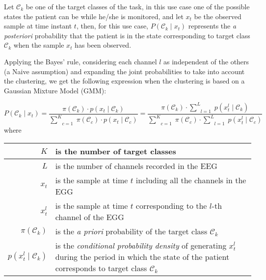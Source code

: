 \documentclass[a4paper,12pt]{article}
\begin{document}
\pagestyle{empty}

Let $\mathcal{C}_{k}$ be one of the target classes of the task, in this use case
one of the possible states the patient can be while he/she is monitored,
and let $x_{t}$ be the observed sample at time instant $t$,
then, for this use case, $P(\mathcal{C}_{k} \mid x_{t})$ represents the
\emph{a posteriori} probability that the patient is in the state corresponding
to target class $\mathcal{C}_{k}$ when the sample $x_{t}$ has been observed.

\bigskip

Applying the Bayes' rule, considering each channel $l$ as independent of the others (a Naive assumption)
and expanding the joint probabilities to take into account the clustering, we get the following 
expression when the clustering is based on a Gaussian Mixture Model (GMM):



\[
P(\mathcal{C}_{k} \mid x_{t})
    = \frac{\pi(\mathcal{C}_{k}) \cdot p(x_{t} \mid \mathcal{C}_{k})}{\underset{c=1}{\overset{K}{\sum}} \;  \pi(\mathcal{C}_{c}) \cdot p(x_{t} \mid \mathcal{C}_{c})}
    = \frac{\pi(\mathcal{C}_{k}) \cdot \underset{l=1}{\overset{L}{\sum}} \; p(x_{t}^{l} \mid \mathcal{C}_{k})}{\underset{c=1}{\overset{K}{\sum}} \; \pi(\mathcal{C}_{c}) \cdot \underset{l=1}{\overset{L}{\sum}} \; p(x_{t}^{l} \mid \mathcal{C}_{c})}
\]
where
\begin{center}
\begin{tabular}{|r|p{130mm}|}
\hline
$K$ & is the number of target classes \\
\hline
$L$ & is the number of channels recorded in the EEG \\
\hline
$x_{t}$ & is the sample at time $t$ including all the channels in the EGG \\
\hline
$x_{t}^{l}$ & is the sample at time $t$ corresponding to the $l$-th channel of the EGG \\
\hline
$\pi(\mathcal{C}_{k})$ & is the \emph{a priori} probability of the target class $\mathcal{C}_{k}$ \\
\hline
$p(x_{t}^{l} \mid \mathcal{C}_{k})$ & is the \emph{conditional probability density}
                                    of generating $x_{t}^{l}$ during the period in which the state
                                    of the patient corresponds to target class $\mathcal{C}_{k}$ \\
\hline
\end{tabular}
\end{center}
\end{document}
